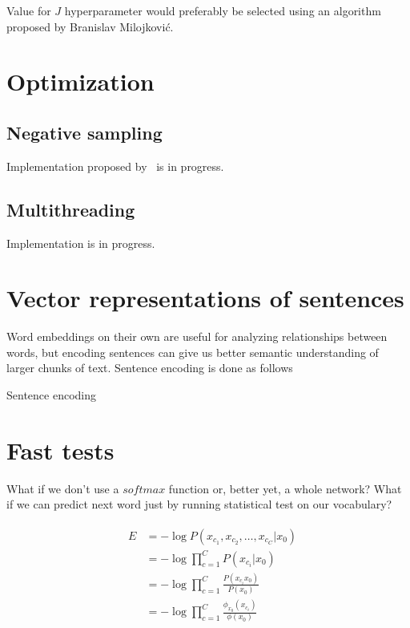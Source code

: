 \documentclass{article}
\newcommand{\SetAlgoStyle}{
	\SetAlgoNoLine
	\SetAlgoNoEnd
	\DontPrintSemicolon
}
\begin{document}
\medbreak

Value for $J$ hyperparameter would preferably be selected using an algorithm proposed by Branislav Milojković.

\section{Optimization}

\subsection{Negative sampling}

Implementation proposed by~\cite{1704.03956} is in progress.

\subsection{Multithreading}

Implementation is in progress.

\section{Vector representations of sentences}

Word embeddings on their own are useful for analyzing relationships between
words, but encoding sentences can give us better semantic understanding of
larger chunks of text. Sentence encoding is done as follows

\begin{algorithm}[H]
	\caption{Sentence encoding}
	\SetAlgoStyle
\end{algorithm}

\section{Fast tests}

What if we don't use a $softmax$ function or, better yet, a whole network? What if
we can predict next word just by running statistical test on our vocabulary?

\begin{align}	
	&\begin{aligned}	
		E &= -\log P(x_{c_1}, x_{c_2},\ldots,x_{c_C}|x_0) \\
		&= -\log \prod_{c=1}^C P(x_{c_i}|x_0) \\
		&= -\log \prod_{c=1}^C \frac{P(x_{c_i}x_0)}{P(x_0)} \\
		&= -\log \prod_{c=1}^C \frac{\phi_{x_0}(x_{c_i})}{\phi(x_0)}
	\end{aligned}
\end{align}
\end{document}
